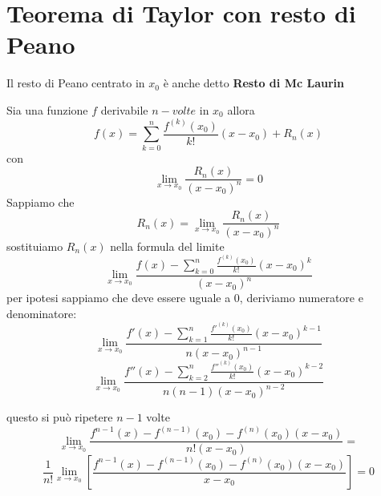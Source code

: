 \documentclass{article}
\begin{document}
\section{Teorema di Taylor con resto di Peano}

Il resto di Peano centrato in $x_{0}$ è anche detto \textbf{Resto di Mc Laurin}

Sia una funzione $f$ derivabile $n-volte$ in $x_{0}$ allora $$ f(x) =
    \sum_{k=0}^n \frac{f^{(k)}(x_{0})}{k!}(x-x_{0}) + R_{n}(x) $$ con $$
    \lim\limits_{ x \to x_{0} } \frac{R_{n}(x)}{(x-x_{0})^n} = 0 $$
Sappiamo che $$R_{n}(x) = \lim\limits_{ x \to x_{0} }
    \frac{R_{n}(x)}{(x-x_{0})^n} $$
sostituiamo $R_{n}(x)$ nella formula del limite
$$ \lim\limits_{ x \to x_{0} } \frac{f(x) - \sum_{k=0}^n
    \frac{f^{(k)}(x_{0})}{k!}(x-x_{0})^{k}}{(x-x_{0})^n}$$
    per ipotesi sappiamo che deve essere uguale a 0, deriviamo numeratore e denominatore: $$
    \lim\limits_{ x \to x_{0} } \frac{f'(x) - \sum_{k=1}^n
    \frac{f'^{(k)}(x_{0})}{k!}(x-x_{0})^{k-1}}{n(x-x_{0})^{n-1}} $$ $$
    \lim\limits_{ x \to x_{0} } \frac{f''(x) - \sum_{k=2}^n
    \frac{f''^{(k)}(x_{0})}{k!}(x-x_{0})^{k-2}}{n(n-1)(x-x_{0})^{n-2}} $$

questo si può ripetere $n-1$ volte $$ \lim\limits_{ x \to x_{0} }
    \frac{f^{n-1}(x) - f^{(n-1)}(x_{0}) - f^{(n)}(x_{0})(x-x_{0})}{n!(x-x_{0})} =$$
$$\frac{1}{n!} \lim\limits_{ x \to x_{0} } \left[ \frac{f^{n-1}(x) -
    f^{(n-1)}(x_{0}) - f^{(n)}(x_{0})(x-x_{0})}{x-x_{0}} \right] = 0 $$
    
\end{document}

